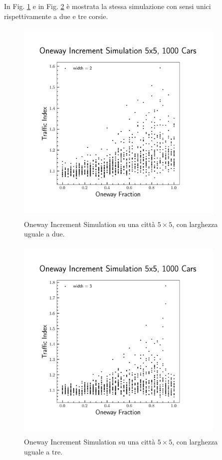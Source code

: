 \documentclass[main.tex]{subfiles}
\begin{document}
        In Fig. \ref{fig:6} e in Fig. \ref{fig:7} è mostrata la stessa simulazione con sensi unici rispettivamente a due e tre corsie.

        \begin{figure}[H]
            \centering
            \includegraphics[width=10cm, height=10cm]{oneway_increment_2.png}  
            \caption{Oneway Increment Simulation su una città $5 \times 5$, con larghezza uguale a due.}
            \label{fig:6}
        \end{figure}

        \begin{figure}[H]
            \centering
            \includegraphics[width=10cm, height=10cm]{oneway_increment_3.png}  
            \caption{Oneway Increment Simulation su una città $5 \times 5$, con larghezza uguale a tre.}
            \label{fig:7}
        \end{figure}

    
\end{document}
